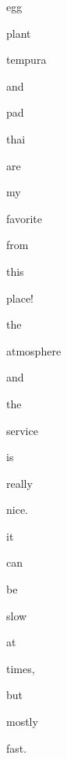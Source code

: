 \documentclass[varwidth]{standalone}
\begin{document}
 \begin{CJK*}{UTF8}{gbsn} 
{\setlength{\fboxsep}{0pt}\colorbox{white!0}{\parbox{0.9\textwidth}{
\colorbox{red!20.92814826965332}{\strut egg} 
\colorbox{red!11.414609909057617}{\strut plant} 
\colorbox{red!100.0}{\strut tempura} 
\colorbox{red!88.0111312866211}{\strut and} 
\colorbox{red!41.98542404174805}{\strut pad} 
\colorbox{red!12.364044189453125}{\strut thai} 
\colorbox{red!10.847989082336426}{\strut are} 
\colorbox{red!3.5171215534210205}{\strut my} 
\colorbox{red!5.697218894958496}{\strut favorite} 
\colorbox{red!3.7875912189483643}{\strut from} 
\colorbox{red!40.14049530029297}{\strut this} 
\colorbox{red!21.830841064453125}{\strut place!} 
\colorbox{red!45.13988494873047}{\strut the} 
\colorbox{red!71.54279327392578}{\strut atmosphere} 
\colorbox{red!3.5528275966644287}{\strut and} 
\colorbox{red!4.925579071044922}{\strut the} 
\colorbox{red!21.548683166503906}{\strut service} 
\colorbox{red!0.0}{\strut is} 
\colorbox{red!2.714942455291748}{\strut really} 
\colorbox{red!21.201574325561523}{\strut nice.} 
\colorbox{red!15.761388778686523}{\strut it} 
\colorbox{red!6.066034317016602}{\strut can} 
\colorbox{red!40.95705032348633}{\strut be} 
\colorbox{red!21.765132904052734}{\strut slow} 
\colorbox{red!13.41109561920166}{\strut at} 
\colorbox{red!7.038954734802246}{\strut times,} 
\colorbox{red!53.989356994628906}{\strut but} 
\colorbox{red!76.16996002197266}{\strut mostly} 
\colorbox{red!22.11875343322754}{\strut fast.} 

}}}\end{CJK*}
\end{document}
